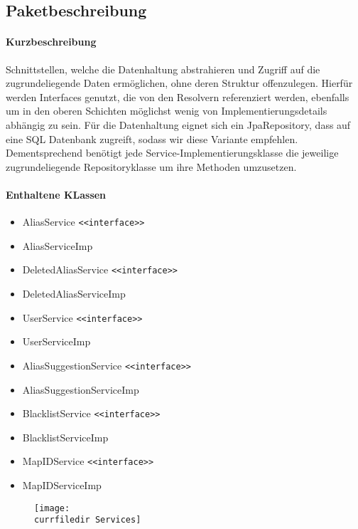 \subsection*{Paketbeschreibung}%
\paragraph*{Kurzbeschreibung}
Schnittstellen, welche die Datenhaltung abstrahieren und Zugriff auf die zugrundeliegende Daten ermöglichen, ohne deren Struktur offenzulegen.
Hierfür werden Interfaces genutzt, die von den Resolvern referenziert werden, ebenfalls um in den oberen Schichten möglichst 
wenig von Implementierungsdetails abhängig zu sein. Für die Datenhaltung eignet sich ein JpaRepository, dass auf 
eine SQL Datenbank zugreift, sodass wir diese Variante empfehlen. Dementsprechend benötigt jede Service-Implementierungsklasse die jeweilige 
zugrundeliegende Repositoryklasse um ihre Methoden umzusetzen. 
\paragraph*{Enthaltene KLassen}
\begin{itemize}
    \item AliasService \texttt{<<interface>>}
    \item AliasServiceImp
    \item DeletedAliasService \texttt{<<interface>>}
    \item DeletedAliasServiceImp
    \item UserService \texttt{<<interface>>}
    \item UserServiceImp
    \item AliasSuggestionService \texttt{<<interface>>}
    \item AliasSuggestionServiceImp
    \item BlacklistService \texttt{<<interface>>}
    \item BlacklistServiceImp
    \item MapIDService \texttt{<<interface>>}
    \item MapIDServiceImp
\end{itemize}

\newpage 
\begin{figure}
    \centering
    \texttt{[image: \\currfiledir Services]}
\end{figure}

